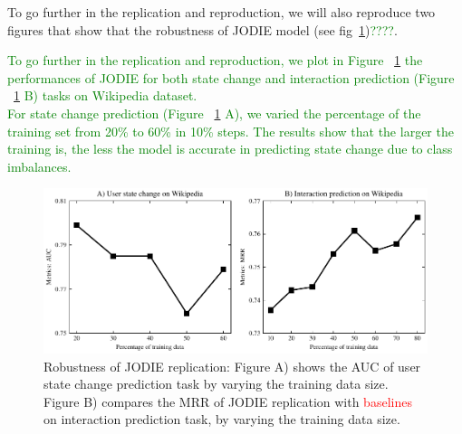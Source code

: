 To go further in the replication and reproduction, we  will also reproduce two figures that show that the robustness of JODIE model (see fig~\ref{percentage-train})\textcolor{green}{????}. 


\textcolor{green}{To go further in the replication and reproduction, we plot in Figure ~\ref{percentage-train} the performances of JODIE for both state change and  interaction prediction (Figure ~\ref{percentage-train} B) tasks on Wikipedia dataset. \\
For state change prediction  (Figure ~\ref{percentage-train}  A), we varied the percentage of the training set from 20\% to 60\% in 10\% steps. The results show that the larger the training is, the less the model is accurate in predicting state change due to class imbalances.  }

\begin{figure}[htbp]
    \centering
    \includegraphics[width = \textwidth]{image/percentage_train.pdf}
    \caption{Robustness of JODIE replication: Figure A) shows the AUC of user state change prediction task by varying the training data size.  Figure B) compares the MRR of JODIE replication with \textcolor{red}{baselines} on interaction prediction task, by varying the training data size. }
    \label{percentage-train}
\end{figure}

